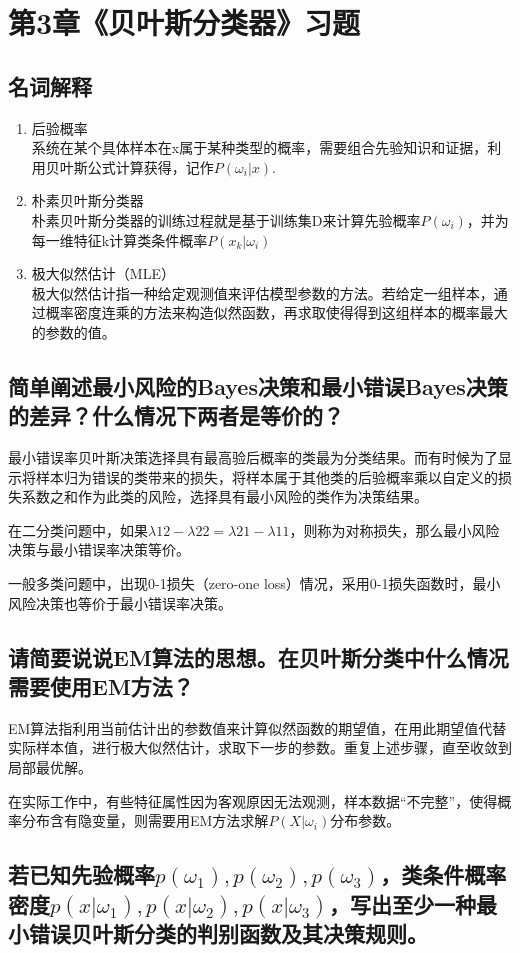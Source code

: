 \documentclass{ctexart}
\begin{document}
\section*{第3章《贝叶斯分类器》习题}
\subsection*{名词解释}
\begin{enumerate}[(1)]
\item 后验概率\\
系统在某个具体样本在x属于某种类型的概率，需要组合先验知识和证据，利用贝叶斯公式计算获得，记作$P(\omega_i|x)$.
\item 朴素贝叶斯分类器\\
朴素贝叶斯分类器的训练过程就是基于训练集D来计算先验概率$P(\omega_i)$，并为每一维特征k计算类条件概率$P(x_k|\omega_i)$
\item 极大似然估计（MLE）\\
极大似然估计指一种给定观测值来评估模型参数的方法。若给定一组样本，通过概率密度连乘的方法来构造似然函数，再求取使得得到这组样本的概率最大的参数的值。
\end{enumerate}

\subsection*{简单阐述最小风险的Bayes决策和最小错误Bayes决策的差异？什么情况下两者是等价的？}
最小错误率贝叶斯决策选择具有最高验后概率的类最为分类结果。而有时候为了显示将样本归为错误的类带来的损失，将样本属于其他类的后验概率乘以自定义的损失系数之和作为此类的风险，选择具有最小风险的类作为决策结果。

在二分类问题中，如果$\lambda12- \lambda22= \lambda21- \lambda11 $，则称为对称损失，那么最小风险决策与最小错误率决策等价。

一般多类问题中，出现0-1损失（zero-one loss）情况，采用0-1损失函数时，最小风险决策也等价于最小错误率决策。
\subsection*{请简要说说EM算法的思想。在贝叶斯分类中什么情况需要使用EM方法？}
EM算法指利用当前估计出的参数值来计算似然函数的期望值，在用此期望值代替实际样本值，进行极大似然估计，求取下一步的参数。重复上述步骤，直至收敛到局部最优解。

在实际工作中，有些特征属性因为客观原因无法观测，样本数据“不完整”，使得概率分布含有隐变量，则需要用EM方法求解$P(X|\omega_i)$分布参数。
\subsection*{若已知先验概率$p(\omega_1 ),p(\omega_2 ),p(\omega_3 )$，类条件概率密度$p(x|\omega_1 ),p(x|\omega_2 ),p(x|\omega_3 )$，写出至少一种最小错误贝叶斯分类的判别函数及其决策规则。}
\end{document}

